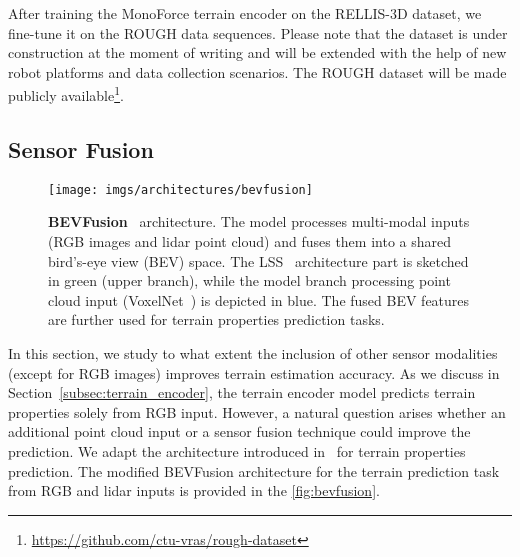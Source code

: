 After training the MonoForce terrain encoder on the RELLIS-3D dataset, we fine-tune it on the ROUGH data sequences.
Please note that the dataset is under construction at the moment of writing and will be extended
with the help of new robot platforms and data collection scenarios.
The ROUGH dataset will be made publicly available\footnote{\url{https://github.com/ctu-vras/rough-dataset}}.


\subsection{Sensor Fusion}\label{subsec:sensor_fusion}
\begin{figure*}[th]
    \centering
    \texttt{[image: imgs/architectures/bevfusion]}
    \caption{\textbf{BEVFusion}~\cite{liu2023bevfusion} architecture. The model processes multi-modal inputs (RGB images and lidar point cloud) and fuses them into a shared bird's-eye view (BEV) space. The LSS~\cite{philion2020lift} architecture part is sketched in green (upper branch), while the model branch processing point cloud input (VoxelNet~\cite{zhou2018voxelnet}) is depicted in blue. The fused BEV features are further used for terrain properties prediction tasks.}
    \label{fig:bevfusion}
\end{figure*}

In this section, we study to what extent the inclusion of other sensor modalities (except for RGB images)
improves terrain estimation accuracy.
As we discuss in Section~\ref{subsec:terrain_encoder}, the terrain encoder model predicts terrain properties
solely from RGB input.
However, a natural question arises whether an additional point cloud input or a sensor fusion technique
could improve the prediction.
We adapt the architecture introduced in~\cite{liu2023bevfusion} for terrain properties prediction.
The modified BEVFusion architecture for the terrain prediction task from RGB and lidar inputs is provided
in the \autoref{fig:bevfusion}.


